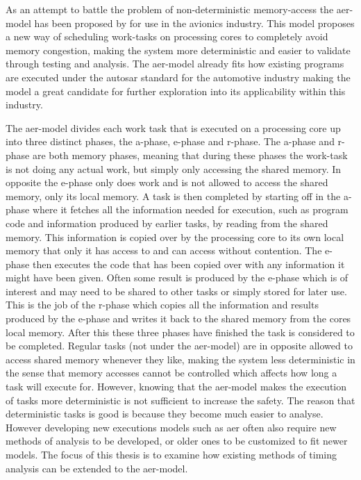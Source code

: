 \documentclass{kththesis}
\begin{document}

As an attempt to battle the problem of non-deterministic memory-access the \acrfull{aer}-model has
been proposed by \textcite{durrieu_predictable_2014} for use in the avionics industry. This model
proposes a new way of scheduling work-tasks on processing cores to completely avoid memory
congestion, making the system more deterministic and easier to validate through testing and
analysis. The \acrshort{aer}-model already fits how existing programs are executed under the
\acrfull{autosar} standard for the automotive industry making the model a great candidate for
further exploration into its applicability within this industry.


The \acrshort{aer}-model divides each work task that is executed on a processing core up into three
distinct phases, the \acrfull{a}-phase, \acrfull{e}-phase and \acrfull{r}-phase. The
\acrshort{a}-phase and \acrshort{r}-phase are both memory phases, meaning that during these phases
the work-task is not doing any actual work, but simply only accessing the shared memory. In opposite the
\acrshort{e}-phase only does work and is not allowed to access the shared memory, only its local
memory. A task is then completed by starting off in the \acrshort{a}-phase where it fetches all the
information needed for execution, such as program code and information produced by earlier tasks,
by reading from the shared memory. This information is copied over by the processing core to its own
local memory that only it has access to and can access without contention. The \acrshort{e}-phase then executes
the code that has been copied over with any information it might have been given. Often some result
is produced by the \acrshort{e}-phase which is of interest and may need to be shared to other tasks or
simply stored for later use. This is the job of the \acrshort{r}-phase which copies all the
information and results produced by the \acrshort{e}-phase and writes it back to the shared memory
from the cores local memory. After this these three phases have finished the task is considered to
be completed. Regular tasks (not under the \acrshort{aer}-model) are in opposite allowed to access
shared memory whenever they like, making the system less deterministic in the sense that memory
accesses cannot be controlled which affects how long a task will execute for. However, knowing that
the \acrshort{aer}-model makes the execution of tasks more deterministic is not sufficient to
increase the safety. The reason that deterministic tasks is good is because they become much easier
to analyse. However developing new executions models such as \acrshort{aer} often also require new
methods of analysis to be developed, or older ones to be customized to fit newer models. The focus
of this thesis is to examine how existing methods of timing analysis can be extended to the
\acrshort{aer}-model. 
\end{document}
